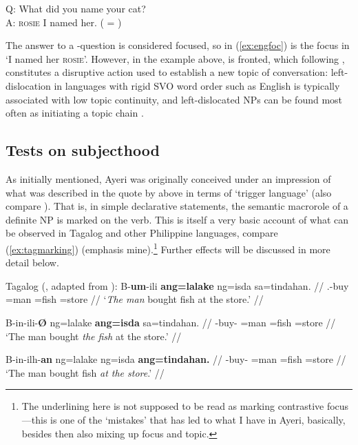 \ex\label{ex:engfoc}%
Q: What did you name your cat?\\
A: \textsc{rosie} I named her. ( = \Foc{})
\xe

The answer to a -question is considered focused, so  in
(\ref{ex:engfoc}) is the focus in `I named her \textsc{rosie}'. However, in the
example above,  is fronted, which following \citet{givon1983},
constitutes a disruptive action used to establish a new topic of conversation:
left-dislocation in languages with rigid SVO word order such as English is
typically associated with low topic continuity, and left-dislocated NPs can be
found most often as initiating a topic chain \citep[32]{givon1983}.

\subsection{Tests on subjecthood}
\label{subsec:subjecthood}

As initially mentioned, Ayeri was originally conceived under an impression of
what was described in the quote by \citet{cowan1995} above in terms of `trigger
language' (also compare \cite{schachter2015}). That is, in simple declarative
statements, the semantic macrorole of a definite NP is marked on the verb. This
is itself a very basic account of what can be observed in Tagalog and other
Philippine languages, compare (\ref{ex:tagmarking}) (emphasis
mine).\footnote{The underlining here is not supposed to be read as marking
contrastive focus---this is one of the `mistakes' that has led to what I have
in Ayeri, basically, besides then also mixing up focus and topic.} Further
effects will be discussed in more detail below.

\pex\label{ex:tagmarking}%
Tagalog (\cite[14]{kroeger1991}, adapted from \cite[135]{foleyvanvalin1984}):
\a\label{ex:tagmarking_av}\begingl
	\gla B-\textbf{um}-ili \textbf{ang=lalake} ng=isda sa=tindahan. //
	\glb \Pfv{}.\Av{}-buy \Nom{}=man \Gen{}=fish \Dat{}=store //
	\glft `\emph{The man} bought fish at the store.' //
\endgl

\a\label{ex:tagmarking_ov}\begingl
	\gla B-in-ili-\textbf{Ø} ng=lalake \textbf{ang=isda} sa=tindahan. //
	\glb \Pfv{}-buy-\Ov{} \Gen{}=man \Nom{}=fish \Dat{}=store //
	\glft `The man bought \emph{the fish} at the store.' //
\endgl

\a\label{ex:tagmarking_dv}\begingl
	\gla B-in-ilh-\textbf{an} ng=lalake ng=isda \textbf{ang=tindahan.} //
	\glb \Pfv{}-buy-\Dv{} \Gen{}=man \Gen{}=fish \Nom{}=store //
	\glft `The man bought fish \emph{at the store}.' //
\endgl

